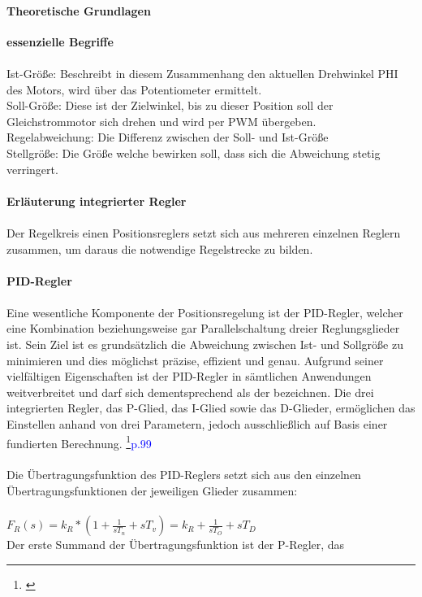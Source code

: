 \documentclass[titlepage,12pt,twoside]{article}
\begin{document}
\paragraph{Theoretische Grundlagen}
\hfill \break
\hfill \break
\textbf{essenzielle Begriffe} \\
\\
Ist-Größe: Beschreibt in diesem Zusammenhang den aktuellen Drehwinkel PHI des Motors, 
wird über das Potentiometer ermittelt. \\
Soll-Größe: Diese ist der Zielwinkel, bis zu dieser Position soll der Gleichstrommotor 
sich drehen und wird per PWM übergeben. \\
Regelabweichung: Die Differenz zwischen der Soll- und Ist-Größe \\
Stellgröße: Die Größe welche bewirken soll, dass sich die Abweichung stetig 
verringert. \\
\\
\textbf{Erläuterung integrierter Regler} \\
\\
Der Regelkreis einen Positionsreglers setzt sich aus mehreren einzelnen 
Reglern zusammen, um daraus die notwendige Regelstrecke zu bilden. \\
\\
\textbf{PID-Regler} \\
\\
Eine wesentliche Komponente der Positionsregelung ist der PID-Regler, 
welcher eine Kombination beziehungsweise gar Parallelschaltung dreier 
Reglungsglieder ist. Sein Ziel ist es grundsätzlich die Abweichung 
zwischen Ist- und Sollgröße zu minimieren und dies möglichst präzise, 
effizient und genau. Aufgrund seiner vielfältigen Eigenschaften ist der 
PID-Regler in sämtlichen Anwendungen weitverbreitet und darf sich 
dementsprechend als der  bezeichnen. Die drei 
integrierten Regler, das P-Glied, das I-Glied sowie das D-Glieder, 
ermöglichen das Einstellen anhand von drei Parametern, jedoch 
ausschließlich auf Basis einer fundierten Berechnung. \footnote{\cite{Haager}}\textcolor{blue}{p.99} \\
\\
Die Übertragungsfunktion des PID-Reglers setzt sich aus den einzelnen 
Übertragungsfunktionen der jeweiligen Glieder zusammen: \\
\\
$F_{R}(s)=k_{R}*(1+\frac{1}{sT_{n}}+sT_{v})=k_{R}+\frac{1}{sT_{O}}+sT_{D} $
\\
Der erste Summand  der Übertragungsfunktion ist der P-Regler, das 
\end{document}
